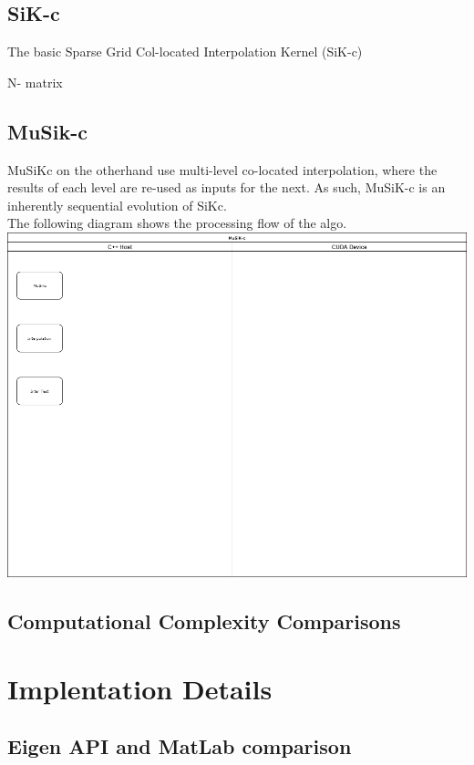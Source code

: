 \documentclass[a4paper]{amsart}
\begin{document}
\subsection{SiK-c}
The basic Sparse Grid Col-located Interpolation Kernel (SiK-c)

N- matrix

\subsection{MuSik-c}
MuSiKc on the otherhand use multi-level co-located interpolation, where the results of each level are re-used as inputs for the next. As such, MuSiK-c is an inherently sequential evolution of SiKc.\\
 The following diagram shows the processing flow of the algo.\\

\includegraphics[scale=0.3]{MuSiKc1.png}

\subsection{Computational Complexity Comparisons}

 

\section{Implentation Details}

\subsection{Eigen API and MatLab comparison}
\end{document}
